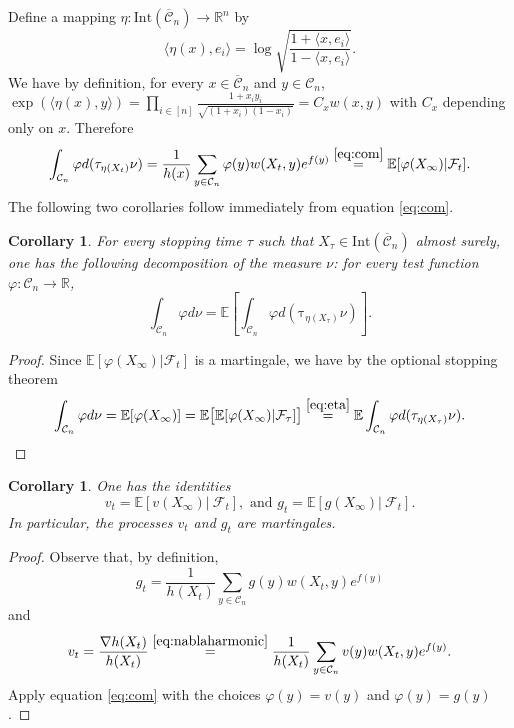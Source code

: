 \documentclass[12pt]{article}
\def \tilt{ \mathrm{\tau} }
\def \RR {\mathbb R}
\def \EE {\mathbb E}
\def \CC {\mathbb C}
\def \FF {\mathcal{F}}
\def \DC {\mathcal{C}_n}
\def \CC {\overline{\mathcal{C}}_n}
\newtheorem{corollary}[theorem]{Corollary}
\theoremstyle{definition}
\theoremstyle{remark}
\begin{document}
Define a mapping  $\eta: \mathrm{Int}(\CC) \to \RR^n$ by 
$$
\langle \eta(x), e_i \rangle = \log \sqrt{\frac{1 + \langle x, e_i \rangle}{1- \langle x, e_i \rangle}}.
$$
We have by definition, for every $x \in \CC$ and $y \in \DC$, $\exp(\langle \eta(x), y \rangle) = \prod_{i \in [n]} \frac{1 + x_i y_i}{\sqrt{(1+x_i)(1-x_i)}} = C_x w(x,y)$ with $C_x$ depending only on $x$. Therefore
\begin{equation}\label{eq:eta}
\int_{\DC} \varphi d (\tilt_{\eta(X_t)} \nu) = \frac{1}{h(x)} \sum_{y \in \DC} \varphi(y) w(X_t, y) e^{f(y)} \stackrel{\eqref{eq:com}}{=} \EE[\varphi(X_\infty) | \FF_t ].
\end{equation}
The following two corollaries follow immediately from equation \eqref{eq:com}.
\begin{corollary}
For every stopping time $\tau$ such that $X_\tau \in \mathrm{Int}(\CC)$ almost surely, one has the following decomposition of the measure $\nu$: for every test function $\varphi:\DC \to \RR$,
\begin{equation}\label{eq:decomposition}
\int_{\DC} \varphi d \nu = \EE \left [  \int_{\DC} \varphi d (\tilt_{\eta(X_\tau)} \nu) \right ].
\end{equation}
\end{corollary}
\begin{proof}
Since $\EE[\varphi(X_\infty) | \FF_t]$ is a martingale, we have by the optional stopping theorem
$$
\int_{\DC} \varphi d \nu = \EE[\varphi(X_\infty)] = \EE \bigl [ \EE[ \varphi(X_\infty) | \FF_{\tau} ] \bigr ] \stackrel{\eqref{eq:eta}}{=} \EE \int_{\DC} \varphi d (\tilt_{\eta(X_\tau)} \nu).
$$
\end{proof}

\begin{corollary}
One has the identities
$$
v_t = \EE[v(X_\infty)| ~ \FF_t], \mbox{ and } g_t = \EE[g(X_\infty)| ~ \FF_t].
$$
In particular, the processes $v_t$ and $g_t$ are martingales.
\end{corollary}
\begin{proof} 
Observe that, by definition,
$$
g_t = \frac{1}{h(X_t)} \sum_{y \in \DC} g(y) w(X_t,y) e^{f(y)}
$$	
and
$$
v_t = \frac{\nabla h(X_t)}{h(X_t)} \stackrel{\eqref{eq:nablaharmonic}}{=} \frac{1}{h(X_t)} \sum_{y \in \DC} v(y) w(X_t,y) e^{f(y)}.
$$
Apply equation \eqref{eq:com} with the choices $\varphi(y)=v(y)$ and $\varphi(y)=g(y)$.
\end{proof}
\end{document}
